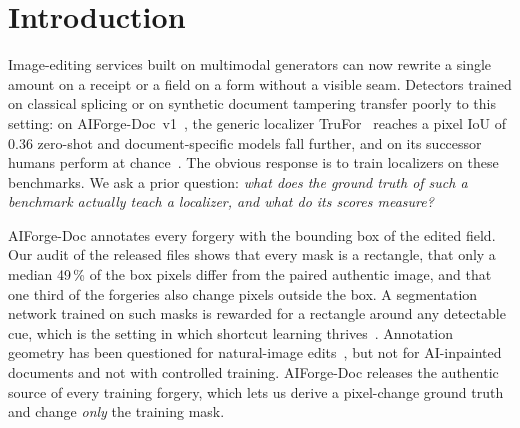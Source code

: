 \section{Introduction}
\label{sec:intro}
Image-editing services built on multimodal generators can now rewrite a single amount on a receipt or a field on a form without a visible seam. Detectors trained on classical splicing or on synthetic document tampering transfer poorly to this setting: on AIForge-Doc~v1~\cite{wu2026aiforgedoc}, the generic localizer TruFor~\cite{guillaro2023trufor} reaches a pixel IoU of 0.36 zero-shot and document-specific models fall further, and on its successor humans perform at chance~\cite{wu2026aiforgedocv2}. The obvious response is to train localizers on these benchmarks. We ask a prior question: \emph{what does the ground truth of such a benchmark actually teach a localizer, and what do its scores measure?}

AIForge-Doc annotates every forgery with the bounding box of the edited field. Our audit of the released files shows that every mask is a rectangle, that only a median 49\,\% of the box pixels differ from the paired authentic image, and that one third of the forgeries also change pixels outside the box. A segmentation network trained on such masks is rewarded for a rectangle around any detectable cue, which is the setting in which shortcut learning thrives~\cite{geirhos2020shortcut}. Annotation geometry has been questioned for natural-image edits~\cite{shang2026maskspixels}, but not for AI-inpainted documents and not with controlled training. AIForge-Doc releases the authentic source of every training forgery, which lets us derive a pixel-change ground truth and change \emph{only} the training mask.

